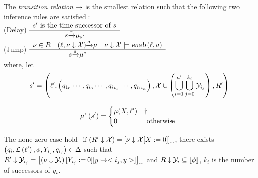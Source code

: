 \begin{definition}

The \emph{transition relation} $\rightarrow$ is the smallest relation such that the following two inference rules are satisfied : \\
(Delay)
$
    \begin{array}{c}
        s' \mbox{ is the time successor of } s \\
        \hline
        {s}{\xrightarrow{\tau}}{\mu_{s'}}
    \end{array}
$
\\
(Jump)
$
    \begin{array}{ccc}
        \nu \in R
        &
        {
                \left ( {\ell} , {{\nu} \downarrow {\mathcal{X}}} \right )
            }{\xrightarrow{a}}{\mu}
        &
        {\nu} \downarrow {\mathcal{X}} \models \mbox{\sl enab}\left( {\ell},{a} \right )
        \\
        \hline
        &
        {s}{\xrightarrow{a}}{\mu^*}
        &
    \end{array}
$
\\
where, let 
\\
$$
s' =  \left (
    \ell'
    ,
    \left (
        q_{1_0}
        \cdots,
        q_{i_0}
        \cdots,
        q_{i_{k_i}}
        \cdots,
        q_{n_{k_n}}
    \right )
    ,
    \mathcal{X} \cup \left(
        \bigcup_{i=1}^{n'} \bigcup_{j=0}^{k_i} \mathcal{Y}_{i_j}
    \right )
    ,
    R'
\right )
$$

\begin{align*}
    \mu^* \left (
       s'
    \right )
    = 
    \begin{cases}
        \mu(X,\ell')
        &
        \dag
        \\
        0
        & 
        \mbox{  otherwise }
    \end{cases}
\end{align*} 

The none zero case hold
$
    \mbox{ if } (
        {R'} \downarrow {\mathcal{X}}) 
        = 
        \left[
            {\nu} \downarrow {\mathcal{X}}
            [X := 0 ]
        \right]_\sim 
$, there exists
$
    \left (
        q_i,
        \mathcal{L}\left(\ell'\right),
        \phi,
        Y_{i_j},
        q_{i_j}
    \right) \in \Delta
$ 
such that \\
$
    {R'} \downarrow {\mathcal{Y}_{i_j}}
    = 
        \left[ \left (
                {\nu} \downarrow {\mathcal{Y}_{i}}
            \right) 
            [ Y_{i_j} := 0 ] 
            [ y \mapsto <i_j,y> ]
        \right]_\sim 
$ 
and 
$    
    {R} \downarrow {\mathcal{Y}_{i}}
    \subseteq {\llbracket}{\phi}{\rrbracket}
$,
$ k_i $ is the number of successors of $ q_i $. 

\end{definition}
